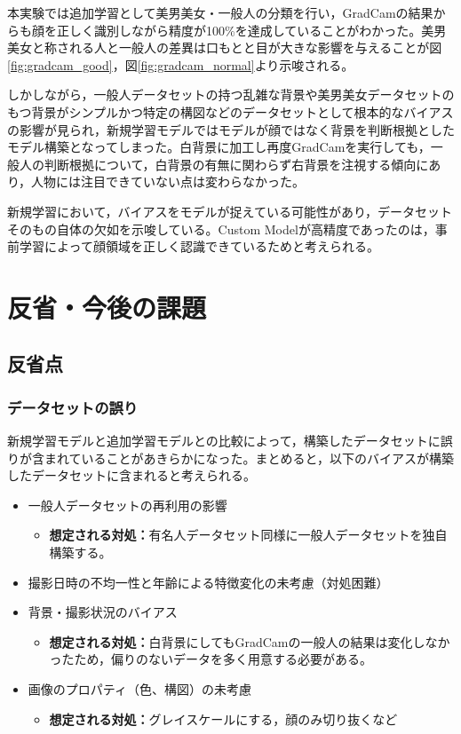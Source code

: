 \documentclass[a4paper,11pt,titlepage]{jsarticle}
\begin{document}
本実験では追加学習として美男美女・一般人の分類を行い，GradCamの結果からも顔を正しく識別しながら精度が100\%を達成していることがわかった。美男美女と称される人と一般人の差異は口もとと目が大きな影響を与えることが図\ref{fig:gradcam_good}，図\ref{fig:gradcam_normal}より示唆される。



しかしながら，一般人データセットの持つ乱雑な背景や美男美女データセットのもつ背景がシンプルかつ特定の構図などのデータセットとして根本的なバイアスの影響が見られ，新規学習モデルではモデルが顔ではなく背景を判断根拠としたモデル構築となってしまった。白背景に加工し再度GradCamを実行しても，一般人の判断根拠について，白背景の有無に関わらず右背景を注視する傾向にあり，人物には注目できていない点は変わらなかった。

新規学習において，バイアスをモデルが捉えている可能性があり，データセットそのもの自体の欠如を示唆している。Custom Modelが高精度であったのは，事前学習によって顔領域を正しく認識できているためと考えられる。


\section{反省・今後の課題}

\subsection{反省点}
\subsubsection*{データセットの誤り}
新規学習モデルと追加学習モデルとの比較によって，構築したデータセットに誤りが含まれていることがあきらかになった。まとめると，以下のバイアスが構築したデータセットに含まれると考えられる。
\begin{itemize}
	\item 一般人データセットの再利用の影響
		\begin{itemize}
			\item \textbf{想定される対処：}有名人データセット同様に一般人データセットを独自構築する。
		\end{itemize}
	\item  撮影日時の不均一性と年齢による特徴変化の未考慮（対処困難）
	\item 背景・撮影状況のバイアス
		\begin{itemize}
			\item \textbf{想定される対処：}白背景にしてもGradCamの一般人の結果は変化しなかったため，偏りのないデータを多く用意する必要がある。
		\end{itemize}
	\item 画像のプロパティ（色、構図）の未考慮
		\begin{itemize}
			\item \textbf{想定される対処：}グレイスケールにする，顔のみ切り抜くなど
		\end{itemize}
\end{itemize}
\end{document}
